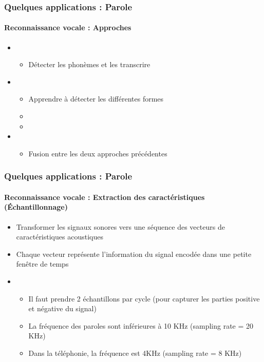 \documentclass[xcolor=table]{beamer}
\begin{document}
\begin{frame}
	\frametitle{Quelques applications : Parole}
	\framesubtitle{Reconnaissance vocale : Approches}
	\begin{itemize}
		\item {}
		\begin{itemize}
			\item Détecter les phonèmes et les transcrire
		\end{itemize}
		\item {}
		\begin{itemize}
			\item Apprendre à détecter les différentes formes
			\item {} 
			\item {}
		\end{itemize}
		\item {}
		\begin{itemize}
			\item Fusion entre les deux approches précédentes
		\end{itemize}
	\end{itemize}
\end{frame}


\begin{frame}
	\frametitle{Quelques applications : Parole}
	\framesubtitle{Reconnaissance vocale : Extraction des caractéristiques (Échantillonnage)}
	\begin{itemize}
		\item Transformer les signaux sonores vers une séquence des vecteurs de caractéristiques acoustiques
		\item Chaque vecteur représente l'information du signal encodée dans une petite fenêtre de temps
		\item {}
		\begin{itemize}
			\item Il faut prendre 2 échantillons par cycle (pour capturer les parties positive et négative du signal)
			\item La fréquence des paroles sont inférieures à 10 KHz (sampling rate = 20 KHz)
			\item Dans la téléphonie, la fréquence est 4KHz (sampling rate = 8 KHz)
		\end{itemize}
	\end{itemize}
\end{frame}
\end{document}
